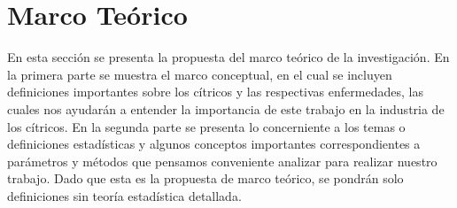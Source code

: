\chapter{Marco Te\'{o}rico}
En esta secci\'{o}n se presenta la propuesta del marco te\'{o}rico de la investigaci\'{o}n. En la primera parte se muestra el marco conceptual, en el cual se incluyen definiciones importantes sobre los c\'{i}tricos y las respectivas enfermedades, las cuales nos ayudar\'{a}n a entender la importancia de este trabajo en la industria de los c\'{i}tricos. En la segunda parte se presenta lo concerniente a los temas o definiciones estad\'{i}sticas y algunos conceptos importantes correspondientes a par\'{a}metros y m\'{e}todos que pensamos conveniente analizar para realizar nuestro trabajo. Dado que esta es la propuesta de marco te\'{o}rico, se pondr\'{a}n solo definiciones sin teor\'{i}a estad\'{i}stica detallada.


